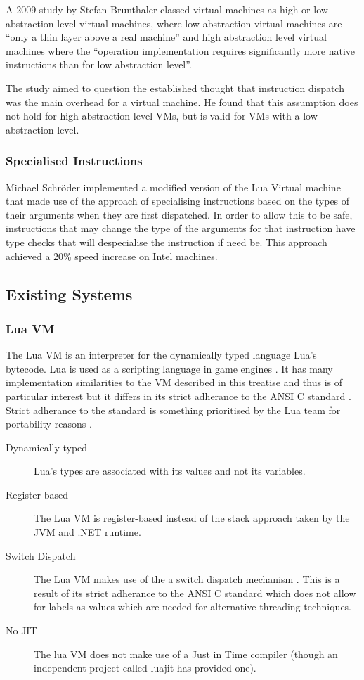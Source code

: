 \documentclass[english,a4paper]{article}
\begin{document}
A 2009 study\cite{Brunthaler20093} by Stefan Brunthaler classed
virtual machines as high or low abstraction level virtual machines,
where low abstraction virtual machines are ``only a thin layer above a
real machine'' and high abstraction level virtual machines where the
``operation implementation requires significantly more native
instructions than for low abstraction level''.

The study aimed to question the established thought that instruction
dispatch was the main overhead for a virtual machine. He found that
this assumption does not hold for high abstraction level VMs, but is
valid for VMs with a low abstraction level.

\subsubsection{Specialised Instructions}

Michael Schr{\"o}der implemented a modified version of the Lua Virtual
machine that made use of the approach of specialising instructions
based on the types of their arguments when they are first
dispatched. In order to allow this to be safe, instructions that may
change the type of the arguments for that instruction have type checks
that will despecialise the instruction if need be. This approach
achieved a 20\% speed increase on Intel machines\cite{Schroder2012}.

\subsection{Existing Systems}

\subsubsection{Lua VM}

The Lua VM is an interpreter for the dynamically typed language Lua's
bytecode. Lua is used as a scripting language in game engines
\cite{LuaUsed}. It has many implementation similarities to the VM
described in this treatise and thus is of particular interest but it
differs in its strict adherance to the ANSI C standard
\cite{RobertoIerusalimschy}. Strict adherance to the standard is
something prioritised by the Lua team for portability reasons
\cite{RobertoIerusalimschy}.
\begin{description}
\item[Dynamically typed] Lua's types are associated with its values
  and not its variables.
\item[Register-based] The Lua VM is register-based instead of the
  stack approach taken by the JVM and .NET runtime.
\item[Switch Dispatch] The Lua VM makes use of the a switch dispatch
  mechanism \cite{Lua.Source}. This is a result of its strict
  adherance to the ANSI C standard which does not allow for labels as
  values which are needed for alternative threading techniques.
\item[No JIT] The lua VM does not make use of a Just in Time compiler
  (though an independent project called luajit has provided one).
\end{description}
\end{document}
